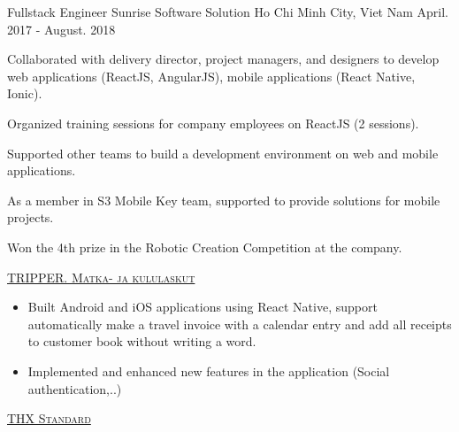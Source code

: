 \begin{cventries}
  \cventry
    {Fullstack Engineer} %
    {Sunrise Software Solution}
    {Ho Chi Minh City, Viet Nam} %
    {April. 2017 - August. 2018} %
    {
      \begin{cvitems} %
        \item {Collaborated with delivery director, project managers, and designers to develop web applications (ReactJS, AngularJS), mobile applications (React Native, Ionic).}
        \item {Organized training sessions for company employees on ReactJS (2 sessions).}
        \item {Supported other teams to build a development environment on web and mobile applications.}
        \item {As a member in S3 Mobile Key team, supported to provide solutions for mobile projects.}
        \item {Won the 4th prize in the Robotic Creation Competition at the company.}
      \end{cvitems}
      \vspace{5mm}
      \vspace{2mm}\hspace{5mm}\faTasks\hspace{1mm}{\fontsize{8pt}{1em}\bodyfont\scshape\color{graytext} {Project}} {\fontsize{9pt}{1em}\bodyfont\scshape\color{awesome} \href{https://gettripper.com}{TRIPPER. Matka- ja kululaskut}}
      \begin{itemize}
        \item {Built Android and iOS applications using React Native, support automatically make a travel invoice with a calendar entry and add all receipts to customer book without writing a word.}
        \item {Implemented and enhanced new features in the application (Social authentication,..)}
      \end{itemize}
      \vspace{2mm}\hspace{5mm}\faTasks\hspace{1mm}{\fontsize{8pt}{1em}\bodyfont\scshape\color{graytext} {Project}} {\fontsize{9pt}{1em}\bodyfont\scshape\color{awesome} \href{https://www.thxstandard.com}{THX Standard}}
      \begin{itemize}

\end{itemize}}
\end{cventries}
